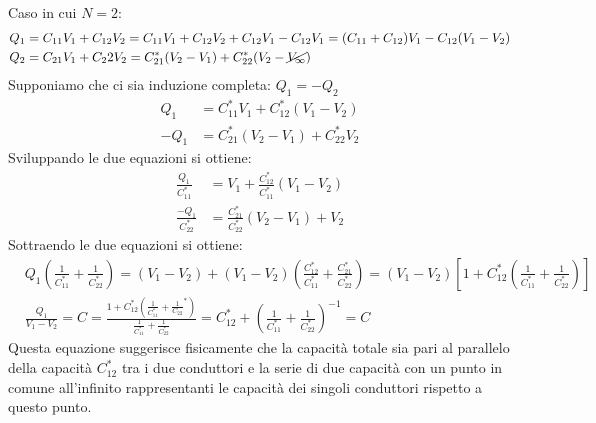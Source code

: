 Caso in cui $N=2$:
$$
\begin{aligned}
Q_1 &= C_{11} V_1 + C_{12}V_2 = C_{11}V_1 + C_{12}V_2 + C_{12}V_1 - C_{12}V_1 = (C_{11}+C_{12})V_1 - C_{12}(V_1-V_2)\\
Q_2 &= C_{21}V_1 + C_22 V_2 = C_{21}^*(V_2-V_1) + C_{22}^*(V_2-\cancel{V_{\infty}})
\end{aligned}
$$
Supponiamo che ci sia induzione completa: $Q_1 = - Q_2$
$$\begin{aligned}
Q_1 &= C_{11}^*V_1 + C_{12}^*(V_1-V_2) \\
-Q_1 &= C_{21}^*(V_2-V_1) + C_{22}^*V_2
\end{aligned}
$$
Sviluppando le due equazioni si ottiene:
$$\begin{aligned}
\frac{Q_1}{C_{11}^*} &= V_1 + \frac{C_{12}^*}{C_{11}^*}(V_1-V_2)\\
\frac{-Q_1}{C_{22}^*} &= \frac{C_{21}^*}{C_{22}^*}(V_2-V_1) + V_2
\end{aligned}
$$
Sottraendo le due equazioni si ottiene:
$$\begin{aligned}
&Q_1\left(\frac{1}{C_{11}^*}+\frac{1}{C_{22}^*}\right) = (V_1-V_2) + (V_1-V_2)\left(\frac{C_{12}^*}{C_{11}^*} + \frac{C_{21}^*}{C_{22}^*} \right) = (V_1 - V_2)\left[1+C_{12}^*\left(\frac{1}{C_{11}^*}+\frac{1}{C_{22}^*}\right)\right]\\
&\frac{Q_1}{V_1-V_2} = C = \frac{1 + C_{12}^*\left(\frac{1}{C_{11}^*} + \frac{1}{C_22}^*\right)}
{\frac{1}{C_{11}^*}+\frac{1}{C_{22}^*}} = C_{12}^* + \left(\frac{1}{C_{11}^*} + \frac{1}{C_{22}^*}\right)^{-1} = C
\end{aligned}
$$
Questa equazione suggerisce fisicamente che la capacità totale sia pari al parallelo della
capacità $C_{12}^*$ tra i due conduttori e la serie di due capacità con un punto in comune
all'infinito rappresentanti le capacità dei singoli conduttori rispetto a questo punto.

